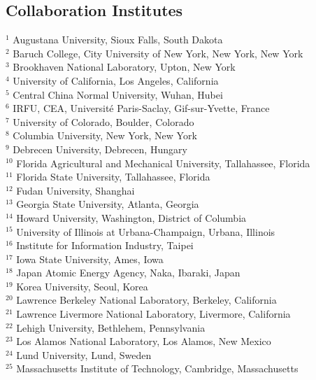 \documentclass[type=preprint,linenumbering=off]{sphenix}
\begin{document}
\begin{flushleft}
\section*{Collaboration Institutes}

$^{1}$ Augustana University, Sioux Falls, South Dakota\\
$^{2}$ Baruch College, City University of New York, New York, New York\\
$^{3}$ Brookhaven National Laboratory, Upton, New York\\
$^{4}$ University of California, Los Angeles, California\\
$^{5}$ Central China Normal University, Wuhan, Hubei\\
$^{6}$ IRFU, CEA, Universit\'{e} Paris-Saclay, Gif-sur-Yvette, France\\
$^{7}$ University of Colorado, Boulder, Colorado\\
$^{8}$ Columbia University, New York, New York\\
$^{9}$ Debrecen University, Debrecen, Hungary\\
$^{10}$ Florida Agricultural and Mechanical University, Tallahassee, Florida\\
$^{11}$ Florida State University, Tallahassee, Florida\\
$^{12}$ Fudan University, Shanghai\\
$^{13}$ Georgia State University, Atlanta, Georgia\\
$^{14}$ Howard University, Washington, District of Columbia\\
$^{15}$ University of Illinois at Urbana-Champaign, Urbana, Illinois\\
$^{16}$ Institute for Information Industry, Taipei\\
$^{17}$ Iowa State University, Ames, Iowa\\
$^{18}$ Japan Atomic Energy Agency, Naka, Ibaraki, Japan\\
$^{19}$ Korea University, Seoul, Korea\\
$^{20}$ Lawrence Berkeley National Laboratory, Berkeley, California\\
$^{21}$ Lawrence Livermore National Laboratory, Livermore, California\\
$^{22}$ Lehigh University, Bethlehem, Pennsylvania\\
$^{23}$ Los Alamos National Laboratory, Los Alamos, New Mexico\\
$^{24}$ Lund University, Lund, Sweden\\
$^{25}$ Massachusetts Institute of Technology, Cambridge, Massachusetts\\

\end{flushleft}
\end{document}

